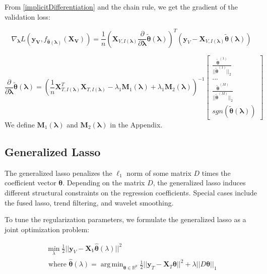 \documentclass[10pt,letterpaper]{article}
\DeclareMathOperator*{\argmin}{arg\,min}
\begin{document}
From \eqref{implicitDifferentiation} and the chain rule, we get the gradient of the validation loss:

\begin{equation}
\nabla_{\boldsymbol \lambda} L(\boldsymbol{y_V}, f_{\hat{\boldsymbol{\theta}}(\boldsymbol{\lambda})}(\boldsymbol{X_V})) =
\frac{1}{n}
\left (
\boldsymbol{X}_{V, I(\boldsymbol\lambda)}
\frac{\partial}{\partial \boldsymbol\lambda} \tilde{\boldsymbol{\theta}}(\boldsymbol{\lambda})
\right )^T
\left (
\boldsymbol{y}_V - \boldsymbol{X}_{V, I(\boldsymbol\lambda)} \tilde{\boldsymbol{\theta}}(\boldsymbol{\lambda})
\right )
\end{equation}

\begin{equation}
\frac{\partial}{\partial \boldsymbol\lambda} \tilde{\boldsymbol{\theta}}(\boldsymbol{\lambda}) =
\left (
\frac{1}{n} \boldsymbol{X}_{T, I(\boldsymbol\lambda)}^T \boldsymbol{X}_{T, I(\boldsymbol\lambda)} - \lambda_1 \boldsymbol{M}_1(\boldsymbol\lambda) + \lambda_1 \boldsymbol{M}_2(\boldsymbol\lambda)
\right ) ^{-1}
\begin{bmatrix}
\frac{\tilde{\boldsymbol{\theta}}^{(1)}}{||\tilde{\boldsymbol{\theta}}^{(1)}||_2}\\
...\\
\frac{\tilde{\boldsymbol\theta}^{(M)}}{||\tilde{\boldsymbol{\theta}}^{(M)}||_2}\\
sgn(\tilde{\boldsymbol{\theta}}(\boldsymbol{\lambda}))
\end{bmatrix}
\end{equation}
We define $\boldsymbol{M}_1(\boldsymbol\lambda)$ and $\boldsymbol{M}_2(\boldsymbol\lambda)$ in the Appendix.

\subsection{Generalized Lasso}
The generalized lasso penalizes the $\ell_1$ norm of some matrix $D$ times the coefficient vector $\boldsymbol \theta$. Depending on the matrix $D$, the generalized lasso induces different structural constraints on the regression coefficients. Special cases include the fused lasso, trend filtering, and wavelet smoothing.

To tune the regularization parameters, we formulate the generalized lasso as a joint optimization problem:

\begin{equation}
\begin{array}{c}
\min_{\lambda} \frac{1}{2} \lvert\lvert \boldsymbol{y}_V - \boldsymbol{X}_V \hat{\boldsymbol{\theta}} (\lambda) \rvert\rvert ^2 \\
\text{ where }
\hat{\boldsymbol{\theta}} (\lambda) =
\argmin_{\boldsymbol{\theta} \in \mathbb{R}^p}
\frac{1}{2} \lvert\lvert \boldsymbol{y}_T - \boldsymbol{X}_T \boldsymbol{\theta} \rvert\rvert ^2
+ \lambda \lvert\lvert D \boldsymbol{\theta} \rvert \rvert_1
\end{array}
\label{genlasso}
\end{equation}
\end{document}
